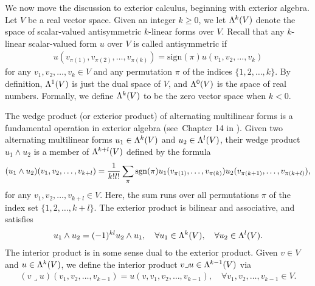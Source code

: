 \documentclass[10pt,a4paper]{article}
\newcommand\cye[1]{%
\protect\leavevmode
\begingroup
    \color{blue}%
    #1%
\endgroup
}
\begin{document}

We now move the discussion to exterior calculus, beginning with exterior algebra.
Let $V$ be a real vector space. 
Given an integer $k \geq 0$, we let $\Lambda^{k}(V)$ denote the space of scalar-valued antisymmetric $k$-linear forms over $V$. 
Recall that any $k$-linear scalar-valued form $u$ over $V$ is called antisymmetric
if 
\begin{gather*} 
    u( v_{\pi(1)}, v_{\pi(2)}, \ldots, v_{\pi(k)} ) 
    = 
    \text{sign}(\pi) 
    u( v_1, v_2, \ldots, v_k ) 
\end{gather*}
for any $v_1, v_2, \dots, v_k \in V$ and any permutation $\pi$ of the indices \(\{1, 2, \ldots, k\}\). 
By definition, $\Lambda^{1}(V)$ is just the dual space of $V$, and $\Lambda^{0}(V)$ is the space of real numbers. 
Formally, we define $\Lambda^{k}(V)$ to be the zero vector space when $k < 0$. 

The wedge product (or exterior product) of alternating multilinear forms is a fundamental operation in exterior algebra
(see~Chapter 14 in \cite{lee2012smooth}). 
Given two alternating multilinear forms \( u_1 \in \Lambda^{k}(V) \) and \( u_2 \in \Lambda^{l}(V) \), 
their wedge product \( u_1 \wedge u_2 \) is a member of $\Lambda^{k+l}(V)$
defined by the formula 
\begin{gather*}
    (u_1 \wedge u_2)(v_1, v_2, \ldots, v_{k+l}) 
    = 
    \frac{1}{k! l!} 
    \sum_{ \pi } 
    \operatorname{sgn}(\pi) 
    u_1( v_{\pi(  1)}, \ldots, v_{\pi(k  )} ) 
    u_2( v_{\pi(k+1)}, \ldots, v_{\pi(k+l)} ),
\end{gather*}
for any \( v_1, v_2, \ldots, v_{k+l} \in V \).
Here, the sum runs over all permutations $\pi$ of the index set \(\{ 1, 2, \ldots, k+l \}\).
The exterior product is bilinear and associative, and satisfies 
\begin{align*}
    u_1 \wedge u_2 = (-1)^{kl} u_2 \wedge u_1,
    \quad 
    \forall u_1 \in \Lambda^{k}(V),
    \quad 
    \forall u_2 \in \Lambda^{l}(V).
\end{align*}
The interior product is in some sense dual to the exterior product. Given $v \in V$ and $u \in \Lambda^{k}(V)$, we define the interior product $v \lrcorner u \in \Lambda^{k-1}(V)$ via 
\begin{align*}
    (v \lrcorner u)( v_1, v_2, \ldots, v_{k-1} ) = u( v, v_1, v_2, \ldots, v_{k-1} ),
    \quad 
    \forall v_1, v_2, \ldots, v_{k-1} \in V.
\end{align*}
\end{document}
